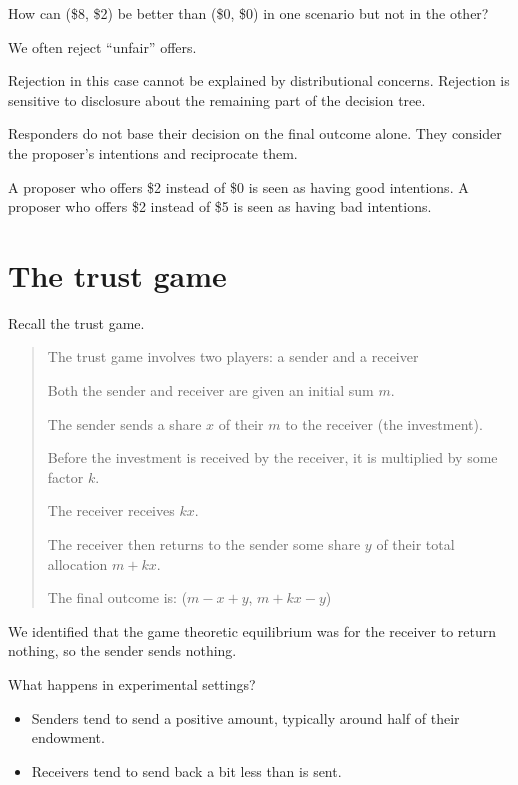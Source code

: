 \documentclass[
  letterpaper,
  DIV=11,
  numbers=noendperiod]{scrreprt}
\begin{document}
How can (\$8, \$2) be better than (\$0, \$0) in one scenario but not in
the other?

We often reject ``unfair'' offers.

Rejection in this case cannot be explained by distributional concerns.
Rejection is sensitive to disclosure about the remaining part of the
decision tree.

Responders do not base their decision on the final outcome alone. They
consider the proposer's intentions and reciprocate them.

A proposer who offers \$2 instead of \$0 is seen as having good
intentions. A proposer who offers \$2 instead of \$5 is seen as having
bad intentions.

\hypertarget{the-trust-game-1}{%
\section{The trust game}\label{the-trust-game-1}}

Recall the trust game.

\begin{quote}
The trust game involves two players: a sender and a receiver

Both the sender and receiver are given an initial sum \(m\).

The sender sends a share \(x\) of their \(m\) to the receiver (the
investment).

Before the investment is received by the receiver, it is multiplied by
some factor \(k\).

The receiver receives \(kx\).

The receiver then returns to the sender some share \(y\) of their total
allocation \(m+kx\).

The final outcome is: (\(m−x+y\), \(m+kx−y\))
\end{quote}

We identified that the game theoretic equilibrium was for the receiver
to return nothing, so the sender sends nothing.

What happens in experimental settings?

\begin{itemize}
\item
  Senders tend to send a positive amount, typically around half of their
  endowment.
\item
  Receivers tend to send back a bit less than is sent.
\end{itemize}
\end{document}
